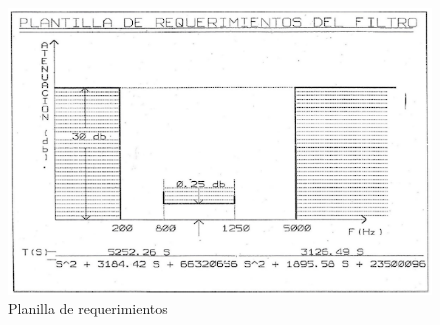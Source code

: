 \begin{figure}[H]
    \centering
    \includegraphics[width=1\linewidth]{figuras/imagen 1.PNG}
    \caption{Planilla de requerimientos}
\end{figure}
